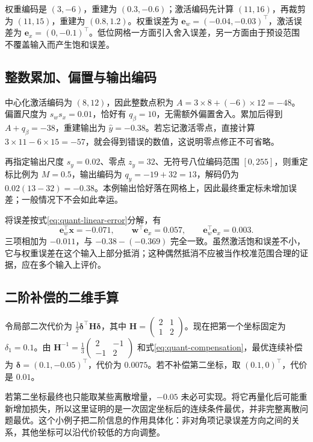 \documentclass[UTF8,12pt,a4paper,fontset=fandol]{ctexart}
\begin{document}
权重编码是 $(3,-6)$，重建为 $(0.3,-0.6)$；激活编码先计算 $(11,16)$，再裁剪为 $(11,15)$，重建为 $(0.8,1.2)$。权重误差为 $\mathbf e_w=(-0.04,-0.03)^\top$，激活误差为 $\mathbf e_x=(0,-0.1)^\top$。低位网格一方面引入舍入误差，另一方面由于预设范围不覆盖输入而产生饱和误差。

\subsection{整数累加、偏置与输出编码}
中心化激活编码为 $(8,12)$，因此整数点积为 $A=3\times8+(-6)\times12=-48$。偏置尺度为 $s_ws_x=0.01$，恰好有 $q_\beta=10$，无需额外偏置舍入。累加后得到 $A+q_\beta=-38$，重建输出为 $\widehat y=-0.38$。若忘记激活零点，直接计算 $3\times11-6\times15=-57$，就会得到错误的数值，这说明零点修正不可省略。

再指定输出尺度 $s_y=0.02$、零点 $z_y=32$、无符号八位编码范围 $[0,255]$，则重定标比例为 $M=0.5$，输出编码为 $q_y=-19+32=13$，解码仍为 $0.02(13-32)=-0.38$。本例输出恰好落在网格上，因此最终重定标未增加误差；一般情况下不会如此幸运。

将误差按式\eqref{eq:quant-linear-error}分解，有
\[
 \mathbf e_w^\top\mathbf x=-0.071,\qquad
 \mathbf w^\top\mathbf e_x=0.057,\qquad
 \mathbf e_w^\top\mathbf e_x=0.003.
\]
三项相加为 $-0.011$，与 $-0.38-(-0.369)$ 完全一致。虽然激活饱和误差不小，它与权重误差在这个输入上部分抵消；这种偶然抵消不应被当作校准范围合理的证据，应在多个输入上评价。

\subsection{二阶补偿的二维手算}
令局部二次代价为 $\tfrac12\boldsymbol\delta^\top\mathbf H\boldsymbol\delta$，其中 $\mathbf H=\begin{pmatrix}2&1\\1&2\end{pmatrix}$。现在把第一个坐标固定为 $\delta_1=0.1$。由 $\mathbf H^{-1}=\tfrac13\begin{pmatrix}2&-1\\-1&2\end{pmatrix}$ 和式\eqref{eq:quant-compensation}，最优连续补偿为 $\boldsymbol\delta=(0.1,-0.05)^\top$，代价为 $0.0075$。若不补偿第二坐标，取 $(0.1,0)^\top$，代价是 $0.01$。

若第二坐标最终也只能取某些离散增量，$-0.05$ 未必可实现。将它再量化后可能重新增加损失，所以这里证明的是一次固定坐标后的连续条件最优，并非完整离散问题最优。这个小例子把二阶信息的作用具体化：非对角项记录误差方向之间的关系，其他坐标可以沿代价较低的方向调整。
\end{document}
